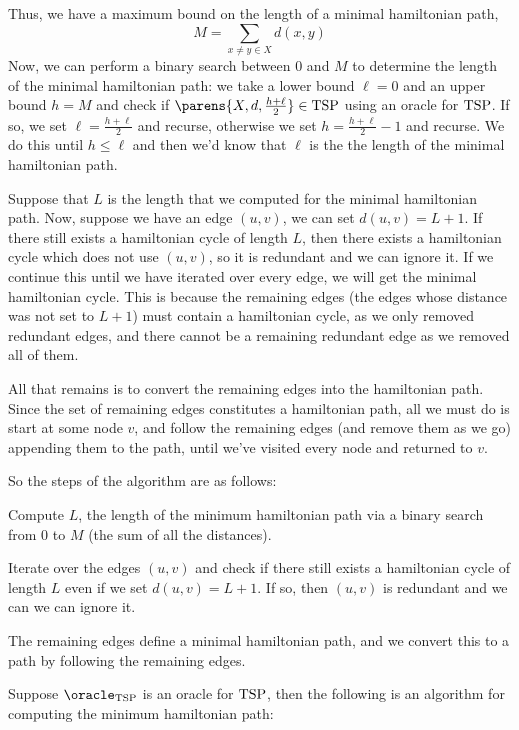 \documentclass[10pt]{article}
\begin{document}
    Thus, we have a maximum bound on the length of a minimal hamiltonian path,
    \[ M = \sum_{x\neq y\in X}d(x,y) \]
    Now, we can perform a binary search between $0$ and $M$ to determine the length of the minimal hamiltonian path: we take a lower bound $\ell=0$ and an upper bound $h=M$ and check if
    $\parens{X,d,\frac{h+\ell}2}\in\TSP$ using an oracle for $\text{TSP}$.
    If so, we set $\ell=\frac{h+\ell}2$ and recurse, otherwise we set $h=\frac{h+\ell}2-1$ and recurse.
    We do this until $h\leq\ell$ and then we'd know that $\ell$ is the the length of the minimal hamiltonian path.

    Suppose that $L$ is the length that we computed for the minimal hamiltonian path.
    Now, suppose we have an edge $(u,v)$, we can set $d(u,v)=L+1$.
    If there still exists a hamiltonian cycle of length $L$, then there exists a hamiltonian cycle which does not use $(u,v)$, so it is redundant and we can ignore it.
    If we continue this until we have iterated over every edge, we will get the minimal hamiltonian cycle.
    This is because the remaining edges (the edges whose distance was not set to $L+1$) must contain a hamiltonian cycle, as we only removed redundant edges, and there cannot be a remaining redundant edge
    as we removed all of them.

    All that remains is to convert the remaining edges into the hamiltonian path.
    Since the set of remaining edges constitutes a hamiltonian path, all we must do is start at some node $v$, and follow the remaining edges (and remove them as we go) appending them to the path,
    until we've visited every node and returned to $v$.

    So the steps of the algorithm are as follows:
    \benum
        \item Compute $L$, the length of the minimum hamiltonian path via a binary search from $0$ to $M$ (the sum of all the distances).
        \item Iterate over the edges $(u,v)$ and check if there still exists a hamiltonian cycle of length $L$ even if we set $d(u,v)=L+1$.
            If so, then $(u,v)$ is redundant and we can we can ignore it.
        \item The remaining edges define a minimal hamiltonian path, and we convert this to a path by following the remaining edges.
    \eenum

    Suppose $\oracle_\TSP$ is an oracle for $\text{TSP}$, then the following is an algorithm for computing the minimum hamiltonian path:
\end{document}
